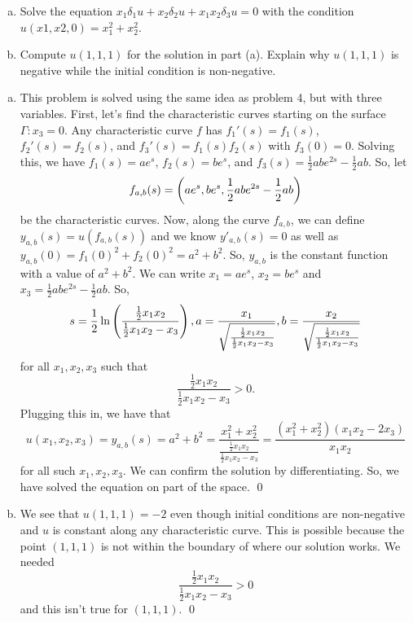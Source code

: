 \documentclass{article}
\renewcommand{\d}{\delta}
\begin{document}
\newpage
{} 
\begin{enumerate}[(a)]
    \item Solve the equation $x_1\d_1u+x_2\d_2u+x_1x_2\d_3u = 0$ with the condition $u(x1, x2, 0) =
    x^2_1 + x^2_2$.
    \item Compute $u(1, 1, 1)$ for the solution in part (a). Explain why $u(1, 1, 1)$ is negative while the
    initial condition is non-negative.
\end{enumerate}
\tri
\hop
\solution
\begin{enumerate}[(a)]
    \item This problem is solved using the same idea as problem 4, but with three variables. First, let's find the characteristic curves starting on the surface $\Gamma: x_3 = 0$. 
    Any characteristic curve $f$ has $f_1'(s) = f_1(s)$, $f_2'(s) = f_2(s)$, and $f_3'(s) = f_1(s)f_2(s)$ with $f_3(0) = 0$. 
    \hop 
    Solving this, we have $f_1(s) = ae^s$, $f_2(s)=be^s$, and $f_3(s)=\frac{1}{2}abe^{2s}-\frac{1}{2}ab$. So, let 
    \[f_{a,b}(s) = \del{ae^s, be^s,\frac{1}{2}abe^{2s}-\frac{1}{2}ab}\]
    be the characteristic curves. Now, along the curve $f_{a,b}$, we can define $y_{a,b}(s) = u(f_{a,b}(s))$ and we know $y'_{a,b}(s) = 0$ as well as $y_{a,b}(0) = f_1(0)^2 + f_2(0)^2 = a^2+b^2$. So, $y_{a,b}$ is the constant function with a value of $a^2 + b^2$. 
    \hop 
    We can write $x_1 = ae^s$, $x_2 = be^s$ and $x_3=\frac{1}{2}abe^{2s}-\frac{1}{2}ab$. So,
    \[s = \frac{1}{2}\ln\del{\frac{\frac{1}{2}x_1x_2}{\frac{1}{2}x_1x_2-x_3}}, a = \frac{x_1}{\sqrt{\frac{\frac{1}{2}x_1x_2}{\frac{1}{2}x_1x_2-x_3}}}, b = \frac{x_2}{\sqrt{\frac{\frac{1}{2}x_1x_2}{\frac{1}{2}x_1x_2-x_3}}}\]
    for all $x_1,x_2,x_3$ such that 
    \[\frac{\frac{1}{2}x_1x_2}{\frac{1}{2}x_1x_2-x_3} > 0.\]
    Plugging this in, we have that 
    \[u(x_1, x_2, x_3) = y_{a,b}(s)=a^2+b^2 = \frac{x_1^2 + x_2^2}{\frac{\frac{1}{2}x_1x_2}{\frac{1}{2}x_1x_2-x_3}} = \frac{(x_1^2+x_2^2)(x_1x_2-2x_3)}{x_1x_2}\]
    for all such $x_1, x_2,x_3$. We can confirm the solution by differentiating. So, we have solved the equation on part of the space. \qed
    \item We see that $u(1,1,1) = -2$ even though initial conditions are non-negative and $u$ is constant along any characteristic curve. This is possible because the point $(1,1,1)$ is not within the boundary of where our solution works. We needed
    \[\frac{\frac{1}{2}x_1x_2}{\frac{1}{2}x_1x_2-x_3} > 0\]
    and this isn't true for $(1,1,1)$. \qed
\end{enumerate}
\end{document}

